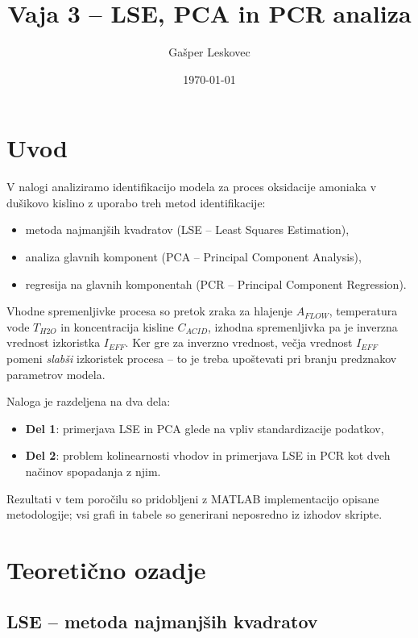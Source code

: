 \documentclass[a4paper, 11pt]{article}
\title{Vaja 3 -- LSE, PCA in PCR analiza}
\author{Gašper Leskovec}
\date{\today}
\begin{document}
\maketitle

\section{Uvod}

V nalogi analiziramo identifikacijo modela za proces oksidacije amoniaka v dušikovo kislino
z uporabo treh metod identifikacije:
\begin{itemize}
    \item metoda najmanjših kvadratov (LSE -- Least Squares Estimation),
    \item analiza glavnih komponent (PCA -- Principal Component Analysis),
    \item regresija na glavnih komponentah (PCR -- Principal Component Regression).
\end{itemize}

Vhodne spremenljivke procesa so pretok zraka za hlajenje $A_{FLOW}$, temperatura vode
$T_{H2O}$ in koncentracija kisline $C_{ACID}$, izhodna spremenljivka pa je inverzna
vrednost izkoristka $I_{EFF}$. Ker gre za inverzno vrednost, večja vrednost $I_{EFF}$
pomeni \emph{slabši} izkoristek procesa -- to je treba upoštevati pri branju predznakov
parametrov modela.

Naloga je razdeljena na dva dela:
\begin{itemize}
    \item \textbf{Del 1}: primerjava LSE in PCA glede na vpliv standardizacije podatkov,
    \item \textbf{Del 2}: problem kolinearnosti vhodov in primerjava LSE in PCR kot dveh
    načinov spopadanja z njim.
\end{itemize}

Rezultati v tem poročilu so pridobljeni z MATLAB implementacijo opisane metodologije;
vsi grafi in tabele so generirani neposredno iz izhodov skripte.

\section{Teoretično ozadje}

\subsection{LSE -- metoda najmanjših kvadratov}
\end{document}
